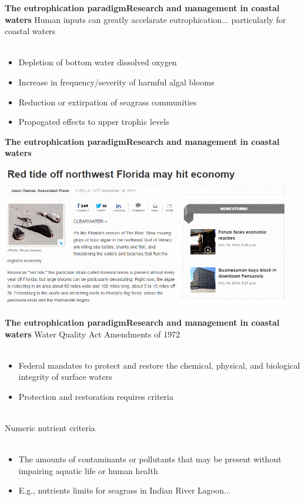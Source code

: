 \documentclass[serif]{beamer}\usepackage[]{graphicx}\usepackage[]{color}
\begin{document}
\begin{frame}{\textbf{The eutrophication paradigm}}{\textbf{Research and management in coastal waters}}
\onslide<+->
Human inputs can greatly accelarate eutrophication... particularly for coastal waters \\~\\
\begin{itemize}
\onslide<+->
\item Depletion of bottom water dissolved oxygen \cite{Diaz08}
\onslide<+->
\item Increase in frequency/severity of harmful algal blooms \cite{Glibert13}
\onslide<+->
\item Reduction or extirpation of seagrass communities \cite{Tomasko05}
\onslide<+->
\item Propogated effects to upper trophic levels \cite{Powers05}
\end{itemize}
\end{frame}

\begin{frame}{\textbf{The eutrophication paradigm}}{\textbf{Research and management in coastal waters}}
\centerline{\includegraphics[width = 0.95\textwidth]{fig/redtide.png}}
\end{frame}

\begin{frame}{\textbf{The eutrophication paradigm}}{\textbf{Research and management in coastal waters}}
\onslide<+->
Water Quality Act Amendments of 1972 \\~\\
\begin{itemize}
\item Federal mandates to \alert{protect and restore} the chemical, physical, and biological integrity of \alert{surface waters}
\item Protection and restoration requires \alert{criteria} \\~\\
\end{itemize}
\onslide<+->
Numeric nutrient criteria \\~\\
\begin{itemize}
\item The amounts of contaminants or pollutants that may be present without impairing aquatic life or human health 
\item E.g., nutrients limits for seagrass in Indian River Lagoon...
\end{itemize}
\end{frame}
\end{document}
